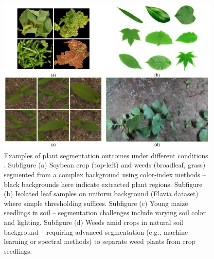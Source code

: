\documentclass[letterpaper]{report}
\begin{document}
\begin{figure}[h!]
	\centering
	\includegraphics[width=0.5\linewidth]{./figures/segmentation-review.png}
	\caption[Examples of plant segmentation outcomes under different conditions]{Examples of plant segmentation outcomes under different conditions \parencite{Wu2021-gt}. Subfigure (a) Soybean crop (top-left) and weeds (broadleaf, grass) segmented from a complex background using color-index methods – black backgrounds here indicate extracted plant regions. Subfigure (b) Isolated leaf samples on uniform background (Flavia dataset) where simple thresholding suffices. Subfigure (c) Young maize seedlings in soil – segmentation challenges include varying soil color and lighting. Subfigure (d) Weeds amid crops in natural soil background – requiring advanced segmentation (e.g., machine learning or spectral methods) to separate weed plants from crop seedlings.}
	\label{fig:segmentation-example}
\end{figure}
%
\end{document}
